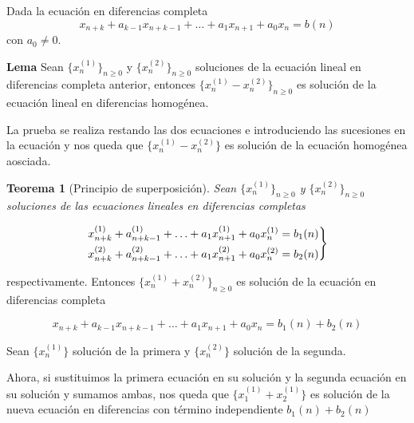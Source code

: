 \documentclass[11pt, a4paper, titlepage]{article}
\makeatletter
\renewenvironment{proof}[1][\proofname] {\vspace{-15pt}\par\pushQED{\qed}\normalfont\topsep6\p@\@plus6\p@\relax\trivlist\item[\hskip\labelsep\it#1\@addpunct{.}]\ignorespaces}{\popQED\endtrivlist\@endpefalse}
\theoremstyle{theorem-style}
\newtheorem*{nth}{Teorema}
\theoremstyle{definition-style}
\theoremstyle{remark-style}
\theoremstyle{example-style}
\newenvironment{rcases}
  {\left.\begin{aligned}}
  {\end{aligned}\right\rbrace}
\makeatother
\begin{document}
     Dada la ecuación en diferencias completa
      $$x_{n+k} + a_{k-1}x_{n+k-1} + \hdots + a_{1}x_{n+1} + a_{0}x_{n} = b(n)$$
      con $a_{0} \neq 0$.

      \textbf{Lema}
      Sean $\{x_{n}^{(1)}\}_{n \geq 0}$ y $\{x_{n}^{(2)}\}_{n \geq 0}$ soluciones de
      la ecuación lineal en diferencias completa anterior, entonces
      $\{x_{n}^{(1)} - x_{n}^{(2)}\}_{n \geq 0}$ es solución de la ecuación lineal
      en diferencias homogénea.

\begin{proof}
	La prueba se realiza restando las dos ecuaciones e introduciendo las sucesiones en la ecuación y nos queda que $\{x_n^{(1)}-x_n^{(2)}\}$ es solución de la ecuación homogénea aosciada.
\end{proof}


      \begin{nth}[Principio de superposición]
        Sean $\{x_{n}^{(1)}\}_{n\geq0}$ y $\{x_{n}^{(2)}\}_{n\geq0}$ soluciones de
        las ecuaciones lineales en diferencias completas 
      \end{nth}

       $$
        \begin{rcases}
         x_{n+k}^{(1)} + a_{n+k-1}^{(1)} + \hdots + a_{1}x_{n+1}^{(1)} +
         a_{0}x_{n}^{(1)} = b_{1}(n) \\
         x_{n+k}^{(2)} + a_{n+k-1}^{(2)} + \hdots + a_{1}x_{n+1}^{(2)} +
         a_{0}x_{n}^{(2)} = b_{2}(n) \\
        \end{rcases}
        $$

        respectivamente. Entonces $\{x_{n}^{(1)}+ x_{n}^{(2)}\}_{n \geq 0}$ es
        solución de la ecuación en diferencias completa

           $$x_{n+k} + a_{k-1}x_{n+k-1} + \hdots + a_{1}x_{n+1} + a_{0}x_{n} =
        b_{1}(n) + b_{2}(n)$$

\begin{proof}
	Sean $\{x_n^{(1)}\}$ solución de la primera y $\{ x_n^{(2)}\}$ solución de la segunda.

Ahora, si sustituimos la primera ecuación en su solución y la segunda ecuación en su solución y sumamos ambas, nos queda que $\{x_1^{(1)} + x_2^{(1)}\}$ es solución de la nueva ecuación en diferencias con término independiente $b_1(n)+b_2(n)$
\end{proof}
\end{document}
